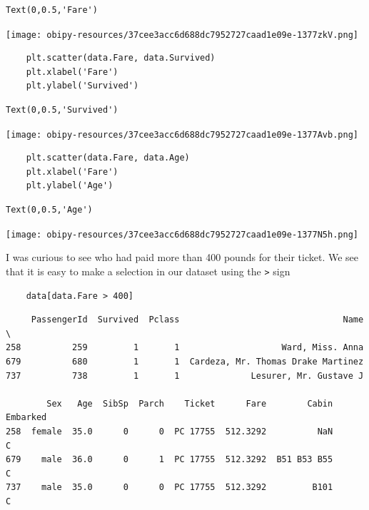 \documentclass[11pt]{article}
\begin{document}
\begin{verbatim}
Text(0,0.5,'Fare')
\end{verbatim}



\begin{center}
\texttt{[image: obipy-resources/37cee3acc6d688dc7952727caad1e09e-1377zkV.png]}
\end{center}

\begin{verbatim}
    plt.scatter(data.Fare, data.Survived)
    plt.xlabel('Fare')
    plt.ylabel('Survived')
\end{verbatim}

\begin{verbatim}
Text(0,0.5,'Survived')
\end{verbatim}



\begin{center}
\texttt{[image: obipy-resources/37cee3acc6d688dc7952727caad1e09e-1377Avb.png]}
\end{center}

\begin{verbatim}
    plt.scatter(data.Fare, data.Age)
    plt.xlabel('Fare')
    plt.ylabel('Age')
\end{verbatim}

\begin{verbatim}
Text(0,0.5,'Age')
\end{verbatim}



\begin{center}
\texttt{[image: obipy-resources/37cee3acc6d688dc7952727caad1e09e-1377N5h.png]}
\end{center}

I was curious to see who had paid more than 400 pounds for their ticket.
We see that it is easy to make a selection in our dataset using the \texttt{>}
sign

\begin{verbatim}
    data[data.Fare > 400]
\end{verbatim}

\begin{verbatim}
     PassengerId  Survived  Pclass                                Name  \
258          259         1       1                    Ward, Miss. Anna   
679          680         1       1  Cardeza, Mr. Thomas Drake Martinez   
737          738         1       1              Lesurer, Mr. Gustave J   

        Sex   Age  SibSp  Parch    Ticket      Fare        Cabin Embarked  
258  female  35.0      0      0  PC 17755  512.3292          NaN        C  
679    male  36.0      0      1  PC 17755  512.3292  B51 B53 B55        C  
737    male  35.0      0      0  PC 17755  512.3292         B101        C  
\end{verbatim}
\end{document}
